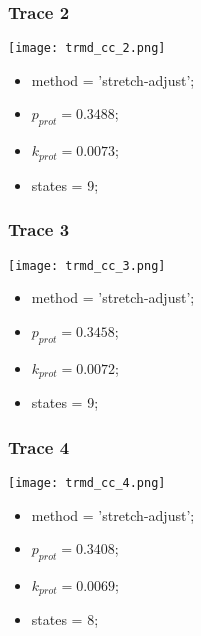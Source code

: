 \subsubsection{Trace 2}
\begin{minipage}[c]{0.7\textwidth}
	\texttt{[image: trmd\_cc\_2.png]}
\end{minipage}
\hfill
\begin{minipage}[c]{0.45\textwidth}
	\begin{itemize}
		\item method = 'stretch-adjust';
		\item $p_{prot}=0.3488$;
		\item $k_{prot}=0.0073$;
		\item states = 9;
	\end{itemize}
\end{minipage}

\subsubsection{Trace 3}
\begin{minipage}[c]{0.7\textwidth}
	\texttt{[image: trmd\_cc\_3.png]}
\end{minipage}
\hfill
\begin{minipage}[c]{0.45\textwidth}
	\begin{itemize}
		\item method = 'stretch-adjust';
		\item $p_{prot}=0.3458$;
		\item $k_{prot}=0.0072$;
		\item states = 9;
	\end{itemize}
\end{minipage}

\subsubsection{Trace 4}
\begin{minipage}[c]{0.7\textwidth}
	\texttt{[image: trmd\_cc\_4.png]}
\end{minipage}
\hfill
\begin{minipage}[c]{0.45\textwidth}
	\begin{itemize}
		\item method = 'stretch-adjust';
		\item $p_{prot}=0.3408$;
		\item $k_{prot}=0.0069$;
		\item states = 8;
	\end{itemize}
\end{minipage}

